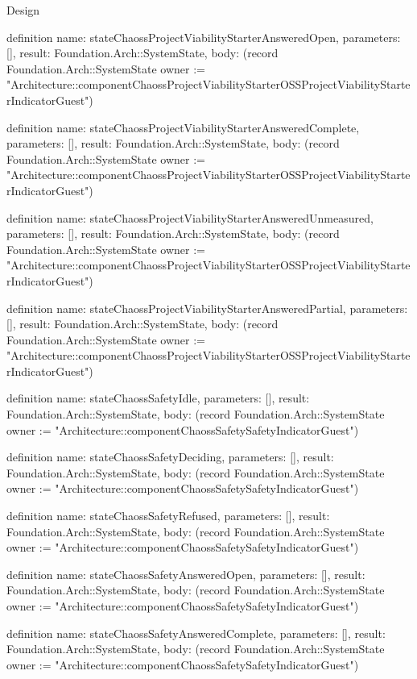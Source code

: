 \begin{lexlean}{Design}
\begin{semanticmodule}
definition{
  name: stateChaossProjectViabilityStarterAnsweredOpen,
  parameters: [],
  result: Foundation.Arch::SystemState,
  body: (record Foundation.Arch::SystemState {owner := "Architecture::componentChaossProjectViabilityStarterOSSProjectViabilityStarterIndicatorGuest"})
}

definition{
  name: stateChaossProjectViabilityStarterAnsweredComplete,
  parameters: [],
  result: Foundation.Arch::SystemState,
  body: (record Foundation.Arch::SystemState {owner := "Architecture::componentChaossProjectViabilityStarterOSSProjectViabilityStarterIndicatorGuest"})
}

definition{
  name: stateChaossProjectViabilityStarterAnsweredUnmeasured,
  parameters: [],
  result: Foundation.Arch::SystemState,
  body: (record Foundation.Arch::SystemState {owner := "Architecture::componentChaossProjectViabilityStarterOSSProjectViabilityStarterIndicatorGuest"})
}

definition{
  name: stateChaossProjectViabilityStarterAnsweredPartial,
  parameters: [],
  result: Foundation.Arch::SystemState,
  body: (record Foundation.Arch::SystemState {owner := "Architecture::componentChaossProjectViabilityStarterOSSProjectViabilityStarterIndicatorGuest"})
}

definition{
  name: stateChaossSafetyIdle,
  parameters: [],
  result: Foundation.Arch::SystemState,
  body: (record Foundation.Arch::SystemState {owner := "Architecture::componentChaossSafetySafetyIndicatorGuest"})
}

definition{
  name: stateChaossSafetyDeciding,
  parameters: [],
  result: Foundation.Arch::SystemState,
  body: (record Foundation.Arch::SystemState {owner := "Architecture::componentChaossSafetySafetyIndicatorGuest"})
}

definition{
  name: stateChaossSafetyRefused,
  parameters: [],
  result: Foundation.Arch::SystemState,
  body: (record Foundation.Arch::SystemState {owner := "Architecture::componentChaossSafetySafetyIndicatorGuest"})
}

definition{
  name: stateChaossSafetyAnsweredOpen,
  parameters: [],
  result: Foundation.Arch::SystemState,
  body: (record Foundation.Arch::SystemState {owner := "Architecture::componentChaossSafetySafetyIndicatorGuest"})
}

definition{
  name: stateChaossSafetyAnsweredComplete,
  parameters: [],
  result: Foundation.Arch::SystemState,
  body: (record Foundation.Arch::SystemState {owner := "Architecture::componentChaossSafetySafetyIndicatorGuest"})
}


\end{semanticmodule}
\end{lexlean}
